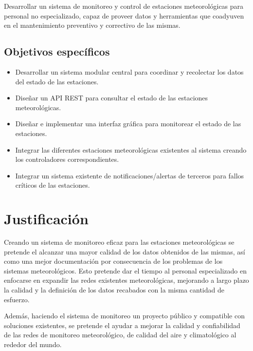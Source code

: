 Desarrollar un sistema de monitoreo y control de estaciones meteorológicas para personal no especializado, capaz de proveer datos y herramientas que coadyuven en el mantenimiento preventivo y correctivo de las mismas.

\subsection{Objetivos específicos}

\begin{itemize}
   \item Desarrollar un sistema modular central para coordinar y recolectar los datos del estado de las estaciones.

   \item Diseñar un API REST para consultar el estado de las estaciones meteorológicas.


   \item Diseñar e implementar una interfaz gráfica para monitorear el estado de las estaciones.

   \item Integrar las diferentes estaciones meteorológicas existentes al sistema creando los controladores correspondientes.

   \item Integrar un sistema existente de notificaciones/alertas de terceros para fallos críticos de las estaciones.
\end{itemize}

\section{Justificación}

Creando un sistema de monitoreo eficaz para las estaciones meteorológicas se pretende el alcanzar una mayor calidad de los datos obtenidos de las mismas, así como una mejor documentación por consecuencia de los problemas de los sistemas meteorológicos. Esto pretende dar el tiempo al personal especializado en enfocarse en expandir las redes existentes meteorológicas, mejorando a largo plazo la calidad y la definición de los datos recabados con la misma cantidad de esfuerzo.

Además, haciendo el sistema de monitoreo un proyecto público y compatible con soluciones existentes, se pretende el ayudar a mejorar la calidad y confiabilidad de las redes de monitoreo meteorológico, de calidad del aire y climatológico al rededor del mundo.

